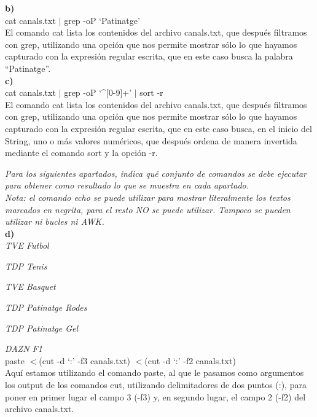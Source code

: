 \documentclass[spanish]{article}
\begin{document}
\textbf{b)}\\

cat canals.txt $\vert$ grep -oP `Patinatge'\\

El comando cat lista los contenidos del archivo canals.txt,
que después filtramos con grep, utilizando una opción que
nos permite mostrar sólo lo que hayamos capturado con la
expresión regular escrita, que en este caso busca la palabra
``Patinatge''.\\

\textbf{c)}\\

cat canals.txt $\vert$ grep -oP `\textasciicircum[0-9]+'
$\vert$ sort -r\\

El comando cat lista los contenidos del archivo canals.txt,
que después filtramos con grep, utilizando una opción que
nos permite mostrar sólo lo que hayamos capturado con la
expresión regular escrita, que en este caso busca, en el
inicio del String, uno o más valores numéricos, que después
ordena de manera invertida mediante el comando sort y la
opción -r.

\newpage

\textit{Para los siguientes apartados, indica qué conjunto
de comandos se debe ejecutar para obtener como resultado lo
que se muestra en cada apartado.}\\

\textit{Nota: el comando echo se puede utilizar para mostrar
literalmente los textos marcados en negrita, para el resto
NO se puede utilizar. Tampoco se pueden utilizar ni bucles
ni AWK.}\\

\textbf{d)}\\

\textit{TVE	Futbol}

\textit{TDP	Tenis}

\textit{TVE	Basquet}

\textit{TDP	Patinatge Rodes}

\textit{TDP	Patinatge Gel}

\textit{DAZN	F1}\\

paste \(<\)(cut -d `:' -f3 canals.txt) \(<\)(cut -d `:' -f2
canals.txt)\\

Aquí estamos utilizando el comando paste, al que le pasamos
como argumentos los output de los comandos cut, utilizando
delimitadores de dos puntos (:), para poner en primer lugar
el campo 3 (-f3) y, en segundo lugar, el campo 2 (-f2) del
archivo canals.txt.\\
\end{document}
